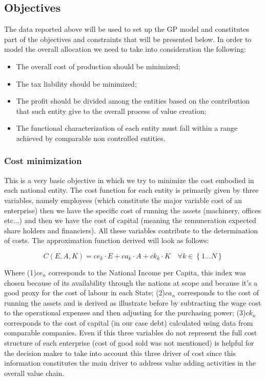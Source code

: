 \documentclass{article}
\begin{document}
\subsection{Objectives}
The data reported above will be used to set up the GP model and constitutes part of the objectives and constraints that will be presented below. In order to model the overall allocation we need to take into consideration the following:
\begin{itemize}
    \item The overall cost of production should be minimized;
    \item The tax liability should be minimized;
    \item The profit should be divided among the entities based on the contribution that such entity give to the overall process of value creation;
    \item The functional characterization of each entity must fall within a range achieved by comparable non controlled entities.
\end{itemize}

\subsubsection{Cost minimization}
This is a very basic objective in which we try to minimize the cost embodied in each national entity. The cost function for each entity is primarily given by three variables, namely employees (which constitute the major variable cost of an enterprise) then we have the specific cost of running the assets (machinery, offices etc...) and then we have the cost of capital (meaning the remuneration expected share holders and financiers). All these variables contribute to the determination of costs. The approximation function derived will look as follows:

\[
C(E,A,K)=ce_k\cdot E+ca_k\cdot A+ck_k\cdot K \quad \forall k \in \left\{1...N\right\}
\]

Where (1)$ce_n$ corresponds to the National Income per Capita, this index was chosen because of its availability through the nations at scope and because it's a good proxy for the cost of labour in each State; (2)$ca_n$ corresponds to the cost of running the assets and is derived as illustrate before by subtracting the wage cost to the operational expenses and then adjusting for the purchasing power; (3)$ck_n$ corresponds to the cost of capital (in our case debt) calculated using data from comparable companies.
Even if this three variables do not represent the full cost structure of each enterprise (cost of good sold was not mentioned) is helpful for the decision maker to take into account this three driver of cost since this information constitutes the main driver to address value adding activities in the overall value chain.
\end{document}
